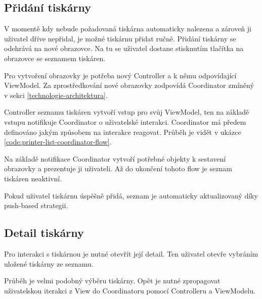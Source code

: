 
\subsection{Přidání tiskárny}

V momentě kdy nebude požadovaná tiskárna automaticky nalezena a zároveň ji uživatel dříve nepřidal, je možné tiskárnu přidat ručně.
Přidání tiskárny se odehrává na nové obrazovce.
Na tu se uživatel dostane stisknutím tlačítka \uv{+} na obrazovce se seznamem tiskáren.

Pro vytvoření obrazovky je potřeba nový Controller a k němu odpovídající ViewModel.
Za zprostředkování nové obrazovky zodpovídá Coordinator zmíněný v sekci \ref{technologie-architektura}.

Controller seznamu tiskáren vytvoří vstup pro svůj ViewModel, ten na základě vstupu notifikuje Coordinator o uživatelské interakci.
Coordinator má předem definováno jakým způsobem na interakce reagovat.
Průběh je vidět v ukázce \ref{code:printer-list-coordinator-flow}.

Na základě notifikace Coordinator vytvoří potřebné objekty k sestavení obrazovky a prezentuje ji uživateli.
Až do ukončení tohoto flow je seznam tiskáren neaktivní.

Pokud uživatel tiskárnu úspěšně přidá, seznam je automaticky aktualizovaný díky push-based strategii.


\subsection{Detail tiskárny}

Pro interakci s tiskárnou je nutné otevřít její detail.
Ten uživatel otevře vybráním uložené tiskárny ze seznamu.

Průběh je velmi podobný výběru tiskárny.
Opět je nutné zpropagovat uživatelskou iterakci z View do Coordinatoru pomocí Controlleru a ViewModelu.